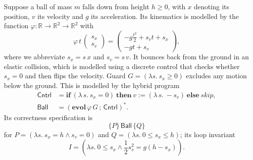\documentclass[envcountsame]{llncs}
\newcommand{\IF}[3]{\mathbf{if}\ #1\ \mathbf{then}\ #2\ \mathbf{else}\ #3}
\newcommand{\flow}{\varphi}
\newcommand{\reals}{\mathbb{R}}
\begin{document}
\begin{example}\label{ex:ball-hoare}
  Suppose a ball of mass $m$ falls down from height $h\geq 0$, with
  $x$ denoting its position, $v$ its velocity and $g$ its
  acceleration. Its kinematics is modelled by the function
  $\flow:\reals\to\reals^2\to\reals^2$ with
 \begin{equation*}
    \flow\, t\,
    \begin{pmatrix}
      s_x\\
      s_v
    \end{pmatrix}
=
\begin{pmatrix}
  -g\frac{t^2}{2}+s_v t+s_x\\
-g t + s_v
\end{pmatrix},
\end{equation*}
where we abbreviate
$s_x = s\, x$ and $s_v = s\, v$.  It bounces back
from the ground in an elastic collision, which is modelled using a
discrete control that checks whether $s_x=0$ and then flips the
velocity.  Guard $G=(\lambda s.\ s_x\geq 0)$ excludes any motion
below the ground. This is modelled by the hybrid
program~\cite{Platzer18}
\begin{align*}
	\mathsf{Cntrl} &= \IF {(\lambda\, s.\ s_x=0)} {v:=(\lambda\, s.\ - s_v)} \mathit{skip},\\
	\mathsf{Ball} &= ({\mathbf{evol}\, \flow\, G}\,  {;}\, \mathsf{Cntrl})^\ast.
\end{align*}
Its correctness specification is
\begin{equation*}
\{P\}\, \mathsf{Ball}\, \{Q\}
\end{equation*}
for $P= (\lambda s.\ s_x = h\land s_v = 0)$ and $Q  = (\lambda s.\
0\leq s_x\leq h)$; its loop invariant
\begin{equation*}
      I = \left(\lambda s.\ 0\le s_x \land \frac{1}{2}s_v^2= g(h - s_x)\right).
\end{equation*}


\end{example}
\end{document}
